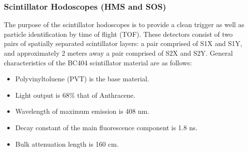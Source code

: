 \subsubsection{Scintillator Hodoscopes (HMS and SOS)}

The purpose of the scintillator hodoscopes is to provide a clean
trigger as well as particle identification by time of flight (TOF). These
detectors consist of two pairs of spatially separated scintillator
layers: a pair comprised of S1X and S1Y, and approximately 2 meters away a pair
comprised of S2X and S2Y. General characteristics of the BC404 scintillator
material are as follows:

\begin{itemize}
\item{Polyvinyltoluene (PVT) is the base material. }
\item{Light output is 68\% that of Anthracene. }
\item{Wavelength of maximum emission is 408 nm.}
\item{Decay constant of the main fluorescence component is 1.8 ns.}
\item{Bulk attenuation length is 160 cm.}
\end{itemize}

